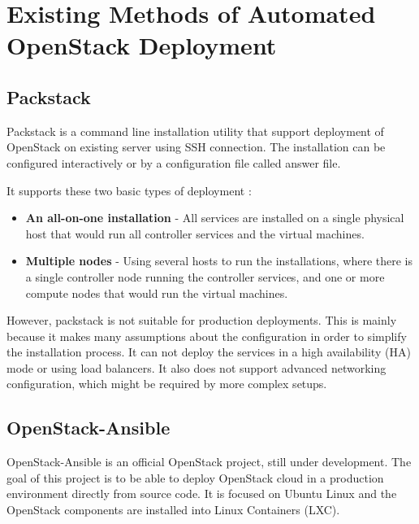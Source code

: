 \chapter{Existing Methods of Automated OpenStack Deployment}
\label{ch:existing}
\section{Packstack}
Packstack is a command line installation utility that support deployment of OpenStack on existing server using SSH connection. The installation can be configured interactively or by a configuration file called answer file. \cite{CL210}


It supports these two basic types of deployment \cite{PackstackRDO}:
\begin{itemize}
  \item{\textbf{An all-on-one installation} - All services are installed on a single physical host that would run all controller services and the virtual machines.}
  \item{\textbf{Multiple nodes} - Using several hosts to run the installations, where there is a single controller node running the controller services, and one or more compute nodes that would run the virtual machines.}

\end{itemize}

However, packstack is not suitable for production deployments. This is mainly because it makes many assumptions about the configuration in order to simplify the installation process. It can not deploy the services in a high availability (HA) mode or using load balancers. It also does not support advanced networking configuration, which might be required by more complex setups. \cite{PackstackRedHat}

\section{OpenStack-Ansible}
OpenStack-Ansible is an official OpenStack project, still under development. The goal of this project is to be able to deploy OpenStack cloud in a production environment directly from source code. It is focused on Ubuntu Linux and the OpenStack components are installed into Linux Containers (LXC). \cite{OpenStackAnsibleOfficial} \cite{OpenStackAnsibleOfficialGit}
